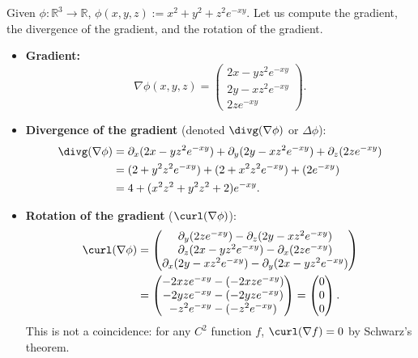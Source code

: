\begin{example}
\label{ex:compute_operators}
Given $\phi : \mathbb{R}^3 \to \mathbb{R}$, $\phi(x,y,z) := x^2 + y^2 + z^2 e^{-xy}$.
Let us compute the gradient, the divergence of the gradient, and the rotation of the gradient.
\begin{itemize}
    \item \textbf{Gradient:}
    \[\nabla \phi(x,y,z) = \begin{pmatrix} 2x - yz^2 e^{-xy} \\ 2y - xz^2 e^{-xy} \\ 2z e^{-xy} \end{pmatrix}.\]
    
    \item \textbf{Divergence of the gradient} (denoted $\divg(\nabla \phi)$ or $\Delta \phi$):
    \begin{align*}
    \divg(\nabla \phi) &= \partial_x(2x - yz^2 e^{-xy}) + \partial_y(2y - xz^2 e^{-xy}) + \partial_z(2z e^{-xy}) \\
    &= (2 + y^2 z^2 e^{-xy}) + (2 + x^2 z^2 e^{-xy}) + (2 e^{-xy}) \\
    &= 4 + (x^2 z^2 + y^2 z^2 + 2) e^{-xy}.
    \end{align*}
    
    \item \textbf{Rotation of the gradient} ($\curl(\nabla \phi)$):
    \begin{align*}
    \curl(\nabla \phi) &= \begin{pmatrix} \partial_y(2z e^{-xy}) - \partial_z(2y - xz^2 e^{-xy}) \\ \partial_z(2x - yz^2 e^{-xy}) - \partial_x(2z e^{-xy}) \\ \partial_x(2y - xz^2 e^{-xy}) - \partial_y(2x - yz^2 e^{-xy}) \end{pmatrix} \\
    &= \begin{pmatrix} -2xz e^{-xy} - (-2xz e^{-xy}) \\ -2yz e^{-xy} - (-2yz e^{-xy}) \\ -z^2 e^{-xy} - (-z^2 e^{-xy}) \end{pmatrix} = \begin{pmatrix} 0 \\ 0 \\ 0 \end{pmatrix}.
    \end{align*}
    This is not a coincidence: for any $C^2$ function $f$, $\curl(\nabla f) = 0$ by Schwarz's theorem.
\end{itemize}
\end{example}

